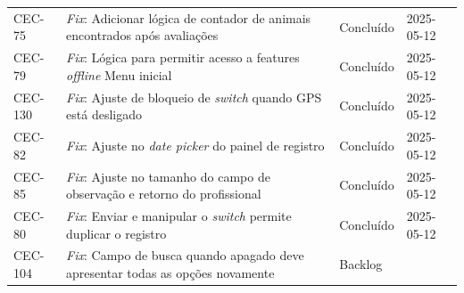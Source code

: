 \begin{longtable}{@{}lp{7cm}ll@{}}
CEC-75 & \textit{Fix}: Adicionar lógica de contador de animais encontrados após avaliações & Concluído & 2025-05-12 \\
CEC-79 & \textit{Fix}: Lógica para permitir acesso a features \textit{offline} Menu inicial & Concluído & 2025-05-12 \\
CEC-130 & \textit{Fix}: Ajuste de bloqueio de \textit{switch} quando GPS está desligado & Concluído & 2025-05-12 \\
CEC-82 & \textit{Fix}: Ajuste no \textit{date picker} do painel de registro & Concluído & 2025-05-12 \\
CEC-85 & \textit{Fix}: Ajuste no tamanho do campo de observação e retorno do profissional & Concluído & 2025-05-12 \\
CEC-80 & \textit{Fix}: Enviar e manipular o \textit{switch} permite duplicar o registro & Concluído & 2025-05-12 \\
CEC-104 & \textit{Fix}: Campo de busca quando apagado deve apresentar todas as opções novamente & Backlog & \\

\end{longtable}
